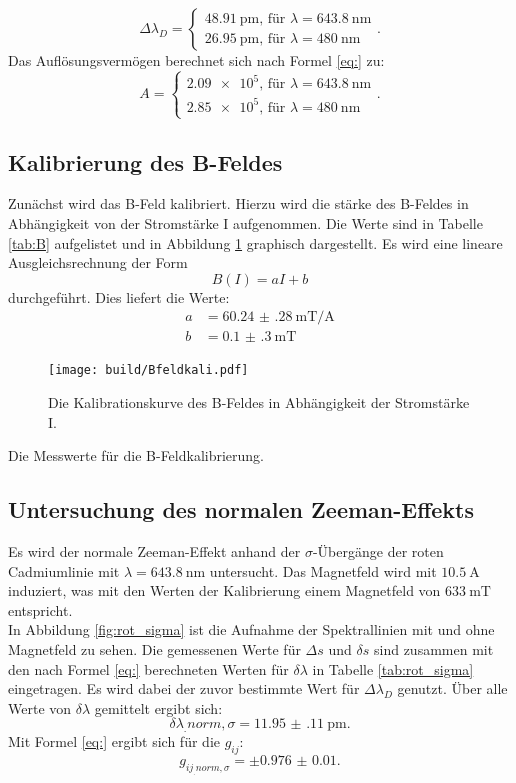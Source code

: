 \[
\Delta\lambda_D =
\begin{cases}
\SI{48.91}{\pico\metre} \text{, für }\lambda=\SI{643.8}{\nano\metre}\\
\SI{26.95}{\pico\metre} \text{, für }\lambda=\SI{480}{\nano\metre}
\end{cases}\text{.}
\]
Das Auflösungsvermögen berechnet sich nach Formel \eqref{eq:} zu:
\[
A = 
\begin{cases}
\num{2.09e5} \text{, für }\lambda=\SI{643.8}{\nano\metre}\\
\num{2.85e5} \text{, für }\lambda=\SI{480}{\nano\metre}
\end{cases}\text{.}
\]

\subsection{Kalibrierung des B-Feldes}

Zunächst wird das B-Feld kalibriert. Hierzu wird die stärke des B-Feldes in Abhängigkeit von der Stromstärke I aufgenommen. Die Werte sind in Tabelle \ref{tab:B} aufgelistet und in Abbildung \ref{fig:B} graphisch dargestellt. Es wird eine lineare Ausgleichsrechnung der Form
\[
B(I) = aI+b
\]
durchgeführt. Dies liefert die Werte:
\begin{align*}
a &= \SI{60.24(28)}{\milli\tesla\per\ampere}\\
b &= \SI{0.1(3)}{\milli\tesla}
\end{align*}

\begin{figure}
	\centering
	\texttt{[image: build/Bfeldkali.pdf]}
	\caption{Die Kalibrationskurve des B-Feldes in Abhängigkeit der Stromstärke I.}
	\label{fig:B}
\end{figure}

\begin{table}
	\centering
	\caption{Die Messwerte für die B-Feldkalibrierung.}
	
	\label{tab:B}
\end{table}

\subsection{Untersuchung des normalen Zeeman-Effekts}

Es wird der normale Zeeman-Effekt anhand der $\sigma$-Übergänge der roten Cadmiumlinie mit $\lambda=\SI{643.8}{\nano\metre}$ untersucht. Das Magnetfeld wird mit $\SI{10.5}{\ampere}$ induziert, was mit den Werten der Kalibrierung einem Magnetfeld von $\SI{633}{\milli\tesla}$ entspricht.\\
In Abbildung \ref{fig:rot_sigma} ist die Aufnahme der Spektrallinien mit und ohne Magnetfeld zu sehen. Die gemessenen Werte für $\Delta s$ und $\delta s$ sind zusammen mit den nach Formel \eqref{eq:} berechneten Werten für $\delta\lambda$ in Tabelle \ref{tab:rot_sigma} eingetragen. Es wird dabei der zuvor bestimmte Wert für $\Delta\lambda_D$ genutzt.
Über alle Werte von $\delta\lambda$ gemittelt ergibt sich:
\[
\delta\lambda_.{norm,\sigma} = \SI{11.95(11)}{\pico\metre}\text{.}
\]
Mit Formel \eqref{eq:} ergibt sich für die $g_{ij}$:
\[
g_{ij_.{norm,\sigma}} = \pm\num{0.976(10)}\text{.}
\]

